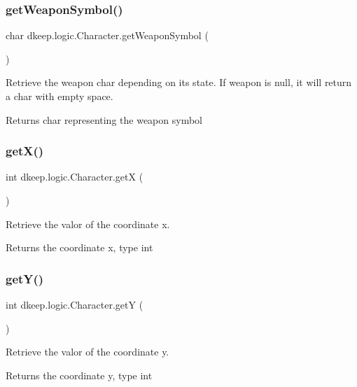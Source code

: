 \subsubsection{\texorpdfstring{get\+Weapon\+Symbol()}{getWeaponSymbol()}}
{\footnotesize\ttfamily char dkeep.\+logic.\+Character.\+get\+Weapon\+Symbol (\begin{DoxyParamCaption}{ }\end{DoxyParamCaption})}

Retrieve the weapon char depending on it\textquotesingle{}s state. If weapon is null, it will return a char with empty space. \begin{DoxyReturn}{Returns}
char representing the weapon symbol 
\end{DoxyReturn}
\mbox{\label{classdkeep_1_1logic_1_1_character_aa8f5ac737dad552c4cffeeaffd2194ec}} 
\subsubsection{\texorpdfstring{get\+X()}{getX()}}
{\footnotesize\ttfamily int dkeep.\+logic.\+Character.\+getX (\begin{DoxyParamCaption}{ }\end{DoxyParamCaption})}

Retrieve the valor of the coordinate x. \begin{DoxyReturn}{Returns}
the coordinate x, type int 
\end{DoxyReturn}
\mbox{\label{classdkeep_1_1logic_1_1_character_a6d872834994ec8c4bea59d1803f3be59}} 
\subsubsection{\texorpdfstring{get\+Y()}{getY()}}
{\footnotesize\ttfamily int dkeep.\+logic.\+Character.\+getY (\begin{DoxyParamCaption}{ }\end{DoxyParamCaption})}

Retrieve the valor of the coordinate y. \begin{DoxyReturn}{Returns}
the coordinate y, type int 
\end{DoxyReturn}
\mbox{\label{classdkeep_1_1logic_1_1_character_a39b7935ecc4b2be1e3070c292d1356bf}} 
